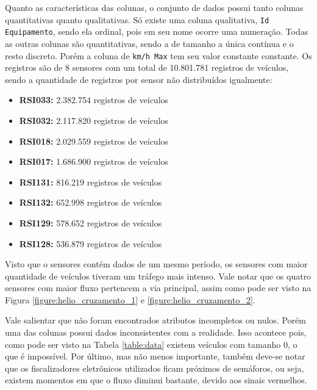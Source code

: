 Quanto as características das colunas, o conjunto de dados possui tanto colunas quantitativas quanto qualitativas. Só existe uma coluna qualitativa, \texttt{Id Equipamento}, sendo ela ordinal, pois em seu nome ocorre uma numeração. Todas as outras colunas são quantitativas, sendo a de tamanho a única contínua e o resto discreto. Porém a coluna de \texttt{km/h Max} tem seu valor constante constante.  Os registros são de 8 sensores com um total de 10.801.781 registros de veículos, sendo a quantidade de registros por sensor não distribuídos igualmente:

\begin{itemize}
    \item \textbf{RSI033:} 2.382.754 registros de veículos
    \item \textbf{RSI032:} 2.117.820 registros de veículos
    \item \textbf{RSI018:} 2.029.559 registros de veículos
    \item \textbf{RSI017:} 1.686.900 registros de veículos
    \item \textbf{RSI131:} 816.219 registros de veículos
    \item \textbf{RSI132:} 652.998 registros de veículos
    \item \textbf{RSI129:} 578.652 registros de veículos
    \item \textbf{RSI128:} 536.879 registros de veículos
\end{itemize}


Visto que o sensores contém dados de um mesmo período, os sensores com maior quantidade de veículos tiveram um tráfego mais intenso. Vale notar que os quatro sensores com maior fluxo pertencem a via principal, assim como pode ser visto na Figura \ref{figure:helio_cruzamento_1} e \ref{figure:helio_cruzamento_2}.

Vale salientar que não foram encontrados atributos incompletos ou nulos. Porém uma das colunas possui dados inconsistentes com a realidade. Isso acontece pois, como pode ser visto na Tabela \ref{table:data} existem veículos com tamanho 0, o que é impossível. Por último, mas não menos importante, também deve-se notar que os fiscalizadores eletrônicos utilizados ficam próximos de semáforos, ou seja, existem momentos em que o fluxo diminui bastante, devido aos sinais vermelhos. 

